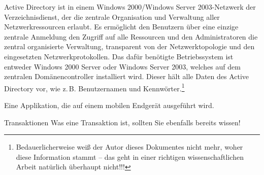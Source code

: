 {Active Directory ist in einem Windows 2000/Windows
Server 2003-Netzwerk der Verzeichnisdienst, der die zentrale
Organisation und Verwaltung aller Netzwerkressourcen erlaubt. Es
erm\"oglicht den Benutzern \"uber eine einzige zentrale Anmeldung den
Zugriff auf alle Ressourcen und den Administratoren die zentral
organisierte Verwaltung, transparent von der Netzwerktopologie und
den eingesetzten Netzwerkprotokollen. Das daf\"ur ben\"otigte
Betriebssystem ist entweder Windows 2000 Server oder
Windows Server 2003, welches auf dem zentralen
Dom\"anencontroller installiert wird. Dieser h\"alt alle Daten des
Active Directory vor, wie z.\,B. Benutzernamen und
Kennw\"orter.\protect\footnote{Bedauerlicherweise wei{\ss} der Autor dieses Dokumentes nicht mehr, woher diese Information stammt -- das 
geht in einer richtigen wissenschaftlichen Arbeit nat\"urlich \"uberhaupt nicht!!!}}




%

{Eine Applikation, die auf einem mobilen Endger\"at ausgef\"uhrt wird.}


%
{Transaktionen}%
{Was eine Transaktion ist, sollten Sie ebenfalls bereits wissen!}





%


%
%



